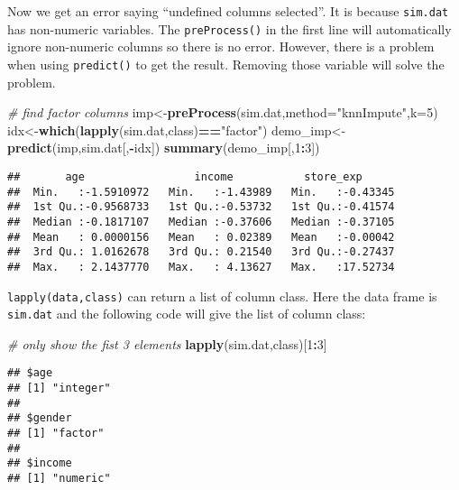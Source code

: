 \documentclass[
]{article}
\newenvironment{Shaded}{\begin{snugshade}}{\end{snugshade}}
\newcommand{\CommentTok}[1]{\textcolor[rgb]{0.56,0.35,0.01}{\textit{#1}}}
\newcommand{\DataTypeTok}[1]{\textcolor[rgb]{0.13,0.29,0.53}{#1}}
\newcommand{\DecValTok}[1]{\textcolor[rgb]{0.00,0.00,0.81}{#1}}
\newcommand{\KeywordTok}[1]{\textcolor[rgb]{0.13,0.29,0.53}{\textbf{#1}}}
\newcommand{\NormalTok}[1]{#1}
\newcommand{\OperatorTok}[1]{\textcolor[rgb]{0.81,0.36,0.00}{\textbf{#1}}}
\newcommand{\StringTok}[1]{\textcolor[rgb]{0.31,0.60,0.02}{#1}}
\begin{document}
Now we get an error saying ``undefined columns selected''. It is because
\texttt{sim.dat} has non-numeric variables. The \texttt{preProcess()} in
the first line will automatically ignore non-numeric columns so there is
no error. However, there is a problem when using \texttt{predict()} to
get the result. Removing those variable will solve the problem.

\begin{Shaded}
\begin{Highlighting}[]
\CommentTok{# find factor columns}
\NormalTok{imp<-}\KeywordTok{preProcess}\NormalTok{(sim.dat,}\DataTypeTok{method=}\StringTok{"knnImpute"}\NormalTok{,}\DataTypeTok{k=}\DecValTok{5}\NormalTok{)}
\NormalTok{idx<-}\KeywordTok{which}\NormalTok{(}\KeywordTok{lapply}\NormalTok{(sim.dat,class)}\OperatorTok{==}\StringTok{"factor"}\NormalTok{)}
\NormalTok{demo_imp<-}\KeywordTok{predict}\NormalTok{(imp,sim.dat[,}\OperatorTok{-}\NormalTok{idx])}
\KeywordTok{summary}\NormalTok{(demo_imp[,}\DecValTok{1}\OperatorTok{:}\DecValTok{3}\NormalTok{])}
\end{Highlighting}
\end{Shaded}

\begin{verbatim}
##       age                 income           store_exp       
##  Min.   :-1.5910972   Min.   :-1.43989   Min.   :-0.43345  
##  1st Qu.:-0.9568733   1st Qu.:-0.53732   1st Qu.:-0.41574  
##  Median :-0.1817107   Median :-0.37606   Median :-0.37105  
##  Mean   : 0.0000156   Mean   : 0.02389   Mean   :-0.00042  
##  3rd Qu.: 1.0162678   3rd Qu.: 0.21540   3rd Qu.:-0.27437  
##  Max.   : 2.1437770   Max.   : 4.13627   Max.   :17.52734
\end{verbatim}

\texttt{lapply(data,class)} can return a list of column class. Here the
data frame is \texttt{sim.dat} and the following code will give the list
of column class:

\begin{Shaded}
\begin{Highlighting}[]
\CommentTok{# only show the fist 3 elements}
\KeywordTok{lapply}\NormalTok{(sim.dat,class)[}\DecValTok{1}\OperatorTok{:}\DecValTok{3}\NormalTok{]}
\end{Highlighting}
\end{Shaded}

\begin{verbatim}
## $age
## [1] "integer"
## 
## $gender
## [1] "factor"
## 
## $income
## [1] "numeric"
\end{verbatim}
\end{document}
